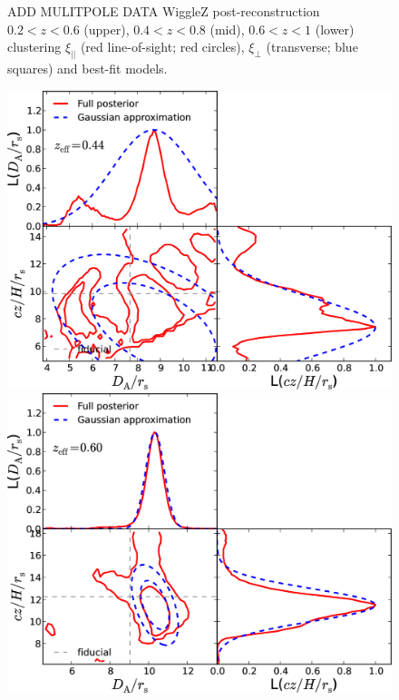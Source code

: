 \documentclass[iop,twocolappendix]{emulateapj}
\newcommand{\red}{\color{red}}
\begin{document}
\begin{figure}[!h]
\begin{center}
\caption{\label{fig:wigglez_wedges_z60}  {\red ADD MULITPOLE DATA} WiggleZ post-reconstruction $0.2<z<0.6$ (upper), $0.4<z<0.8$ (mid), $0.6<z<1$ (lower) clustering $\xi_{||}$ (red line-of-sight; red circles), $\xi_{\perp}$ (transverse; blue squares) and best-fit models.%
}
\end{center}
\end{figure}


\begin{figure}
\begin{center}
\includegraphics[width=0.9\columnwidth]{figures/stacked_L2D_rpt_wedges_postRec_T0.15_WiggleZ_z0pt2_0pt1/stacked_L2D_rpt_wedges_postRec_T015_WiggleZ_z0pt2_0pt6.png}
\includegraphics[width=0.9\columnwidth]{figures/stacked_L2D_rpt_wedges_postRec_T0.15_WiggleZ_z0pt4_0pt8/stacked_L2D_rpt_wedges_postRec_T015_WiggleZ_z0pt4_0pt8.png}

\end{center}
\end{figure}
\end{document}
